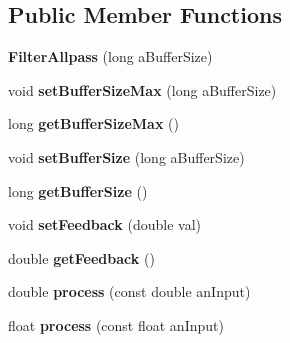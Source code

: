 \subsection*{Public Member Functions}
\begin{DoxyCompactItemize}
\item 
\hypertarget{class_filter_allpass_a7bad6e9dd0bc3e2a8e67a6ba287243e9}{{\bfseries Filter\-Allpass} (long a\-Buffer\-Size)}\label{class_filter_allpass_a7bad6e9dd0bc3e2a8e67a6ba287243e9}

\item 
\hypertarget{class_filter_allpass_a8dff846eca0d606c07a91b348b265372}{void {\bfseries set\-Buffer\-Size\-Max} (long a\-Buffer\-Size)}\label{class_filter_allpass_a8dff846eca0d606c07a91b348b265372}

\item 
\hypertarget{class_filter_allpass_accafa192c6264a5e080b68835feabab9}{long {\bfseries get\-Buffer\-Size\-Max} ()}\label{class_filter_allpass_accafa192c6264a5e080b68835feabab9}

\item 
\hypertarget{class_filter_allpass_a8f5ad43d883643d482c65541e65548ba}{void {\bfseries set\-Buffer\-Size} (long a\-Buffer\-Size)}\label{class_filter_allpass_a8f5ad43d883643d482c65541e65548ba}

\item 
\hypertarget{class_filter_allpass_aff058f1fe7aea8c09ef31ca2f61915ce}{long {\bfseries get\-Buffer\-Size} ()}\label{class_filter_allpass_aff058f1fe7aea8c09ef31ca2f61915ce}

\item 
\hypertarget{class_filter_allpass_a4449cf1c74613e5dfddceb6f611b2793}{void {\bfseries set\-Feedback} (double val)}\label{class_filter_allpass_a4449cf1c74613e5dfddceb6f611b2793}

\item 
\hypertarget{class_filter_allpass_a8d25f65d21b66d617fe5239479311d17}{double {\bfseries get\-Feedback} ()}\label{class_filter_allpass_a8d25f65d21b66d617fe5239479311d17}

\item 
\hypertarget{class_filter_allpass_a205d78909b64f59f68246e1c1841ee21}{double {\bfseries process} (const double an\-Input)}\label{class_filter_allpass_a205d78909b64f59f68246e1c1841ee21}

\item 
\hypertarget{class_filter_allpass_aac8495bc5fc5c01ec3c5767447e281cf}{float {\bfseries process} (const float an\-Input)}\label{class_filter_allpass_aac8495bc5fc5c01ec3c5767447e281cf}

\end{DoxyCompactItemize}
